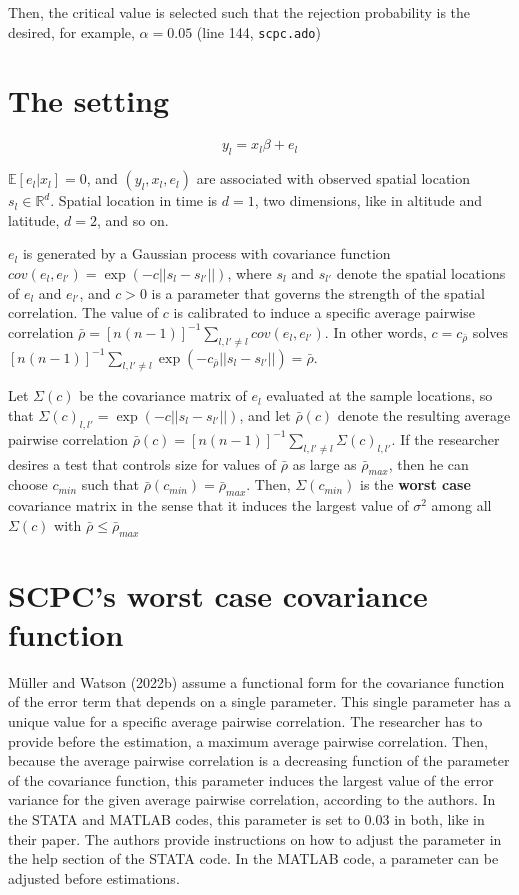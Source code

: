 \documentclass[
]{article}
\begin{document}
Then, the critical value is selected such that the rejection probability
is the desired, for example, \(\alpha=0.05\) (line 144,
\texttt{scpc.ado})

\hypertarget{the-setting}{%
\section{The setting}\label{the-setting}}

\[
y_l = x_l\beta + e_l
\]

\(\mathbb{E}[e_l|x_l]=0\), and \((y_l, x_l, e_l)\) are associated with
observed spatial location \(s_l \in \mathbb{R}^d\). Spatial location in
time is \(d=1\), two dimensions, like in altitude and latitude, \(d=2\),
and so on.

\(e_l\) is generated by a Gaussian process with covariance function
\(cov(e_l,e_{l'})=\exp(-c||s_l-s_{l'}||)\), where \(s_l\) and \(s_{l'}\)
denote the spatial locations of \(e_l\) and \(e_{l'}\), and \(c>0\) is a
parameter that governs the strength of the spatial correlation. The
value of \(c\) is calibrated to induce a specific average pairwise
correlation
\(\bar{\rho}=[n(n-1)]^{-1}\sum_{l,l'\not=l}cov(e_l,e_{l'})\). In other
words, \(c=c_{\bar{\rho}}\) solves
\([n(n-1)]^{-1}\sum_{l,l'\not=l}\exp(-c_{\bar{\rho}}||s_l-s_{l'}||)=\bar{\rho}\).

Let \(\Sigma(c)\) be the covariance matrix of \(e_l\) evaluated at the
sample locations, so that \(\Sigma(c)_{l,l'}=\exp(-c||s_l-s_{l'} ||)\),
and let \(\bar{\rho}(c)\) denote the resulting average pairwise
correlation
\(\bar{\rho}(c)=[n(n-1)]^{-1}\sum_{l,l'\not=l}\Sigma(c)_{l,l'}\). If the
researcher desires a test that controls size for values of
\(\bar{\rho}\) as large as \(\bar{\rho}_{max}\), then he can choose
\(c_{min}\) such that \(\bar{\rho}(c_{min})=\bar{\rho}_{max}\). Then,
\(\Sigma(c_{min})\) is the \textbf{worst case} covariance matrix in the
sense that it induces the largest value of \(\sigma^2\) among all
\(\Sigma(c)\) with \(\bar{\rho}\le \bar{\rho}_{max}\)

\hypertarget{sec-worstcov}{%
\section{SCPC's worst case covariance function}\label{sec-worstcov}}

Müller and Watson (2022b) assume a functional form for the covariance
function of the error term that depends on a single parameter. This
single parameter has a unique value for a specific average pairwise
correlation. The researcher has to provide before the estimation, a
maximum average pairwise correlation. Then, because the average pairwise
correlation is a decreasing function of the parameter of the covariance
function, this parameter induces the largest value of the error variance
for the given average pairwise correlation, according to the authors. In
the STATA and MATLAB codes, this parameter is set to 0.03 in both, like
in their paper. The authors provide instructions on how to adjust the
parameter in the help section of the STATA code. In the MATLAB code, a
parameter can be adjusted before estimations.
\end{document}
